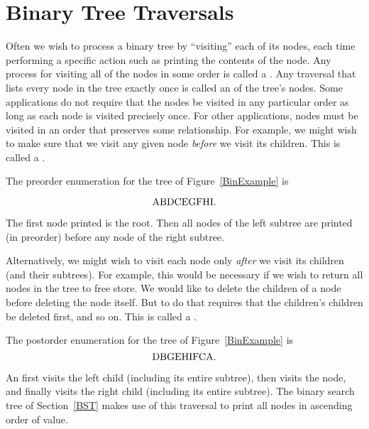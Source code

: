 \section{Binary Tree Traversals}
\label{BinTravers}

Often we wish to process a binary tree by ``visiting'' each of its
nodes, each time performing a specific action such as printing the
contents of the node.
Any process for visiting all of the nodes in some order is
called a .
Any traversal that lists every node in the tree exactly once is
called an  of the
tree's nodes.
Some applications do not require that the nodes be visited in any
particular order as long as each node is visited precisely once.
For other applications, nodes must be visited in an order that
preserves some relationship.
For example, we might wish to make sure that we visit any given node
\emph{before} we visit its children.
This is called a .

\newpage

\begin{example}
The preorder enumeration for the tree of
Figure~\ref{BinExample} is

\vspace{-\medskipamount}
\[{\rm A B D C E G F H I.}\]

\vspace{-\medskipamount}
The first node printed is the root.
Then all nodes of the left subtree are printed (in preorder) before
any node of the right subtree.
\end{example}

Alternatively, we might wish to visit each node only
\emph{after} we visit its children (and their subtrees).
For example, this would be necessary if we wish to return all nodes in 
the tree to free store.
We would like to delete the children of a node before deleting the
node itself.
But to do that requires that the children's children be deleted
first, and so on.
This is called a .

\begin{example}
The postorder enumeration for the tree of Figure~\ref{BinExample}
is \[{\rm D B G E H I F C A.}\]

\vspace{-\medskipamount}
\end{example}

An  first visits the left child
(including its entire subtree), then visits the node, and finally
visits the right child (including its entire
subtree).
The binary search tree of Section~\ref{BST} makes use of this
traversal to print all nodes in ascending order of value.

